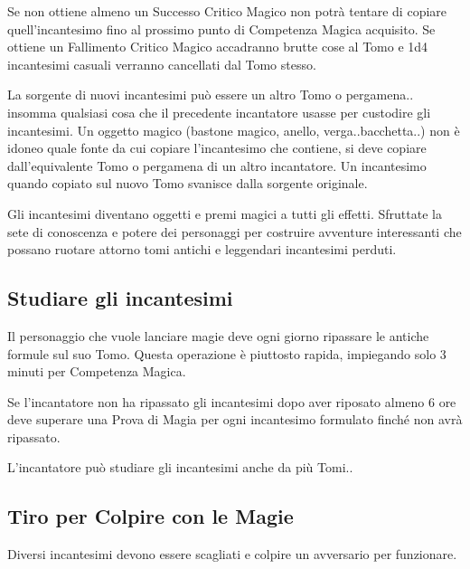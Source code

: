 \begin{multicols}{2}
Se non ottiene almeno un Successo Critico Magico non potrà tentare di copiare quell'incantesimo fino al prossimo punto di Competenza Magica acquisito. Se ottiene un Fallimento Critico Magico accadranno brutte cose al Tomo e 1d4 incantesimi casuali verranno cancellati dal Tomo stesso.

La sorgente di nuovi incantesimi può essere un altro Tomo o pergamena.. insomma qualsiasi cosa che il precedente incantatore usasse per custodire gli incantesimi. Un oggetto magico (bastone magico, anello, verga..bacchetta..) non è idoneo quale fonte da cui copiare l'incantesimo che contiene, si deve copiare dall'equivalente Tomo o pergamena di un altro incantatore. Un incantesimo quando copiato sul nuovo Tomo svanisce dalla sorgente originale.

\begin{narratore}
Gli incantesimi diventano oggetti e premi magici a tutti gli effetti. Sfruttate la sete di conoscenza e potere dei personaggi per costruire avventure interessanti che possano ruotare attorno tomi antichi e leggendari incantesimi perduti.
\end{narratore}

\subsection{Studiare gli incantesimi}\label{magiestudiareincantesimi}

Il personaggio che vuole lanciare magie deve ogni giorno ripassare le antiche formule sul suo Tomo. Questa operazione è piuttosto rapida, impiegando solo 3 minuti per Competenza Magica.

Se l'incantatore non ha ripassato gli incantesimi dopo aver riposato almeno 6 ore deve superare una Prova di Magia per ogni incantesimo formulato finché non avrà ripassato.

L'incantatore può studiare gli incantesimi anche da più Tomi..

\subsection{Tiro per Colpire con le Magie}\label{magietiropercolpireconlemagie}\hypertarget{magietiropercolpireconlemagie}{}

Diversi incantesimi devono essere scagliati e colpire un avversario per funzionare.


\end{multicols}
